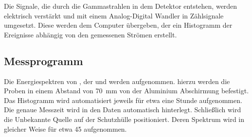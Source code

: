 Die Signale, die durch die Gammastrahlen in dem Detektor entstehen, werden
elektrisch verstärkt und mit einem Analog-Digital Wandler in Zählsignale
umgesetzt. Diese werden dem Computer übergeben, der ein Histogramm der
Ereignisse abhängig von den gemessenen Strömen erstellt.

\subsection{Messprogramm}
Die Energiespektren von , der  und  werden
aufgenommen. hierzu werden die Proben in einem Abstand von \qty{70}{\mm} von
der Aluminium Abschirmung befestigt. Das Histogramm wird automatisiert jeweils
für etwa eine Stunde aufgenommen. Die genaue Messzeit wird in den Daten
automatisch hinterlegt. Schließlich wird die Unbekannte Quelle auf der
Schutzhülle positioniert. Deren Spektrum wird in gleicher Weise für etwa
\qty{45}{\min} aufgenommen.